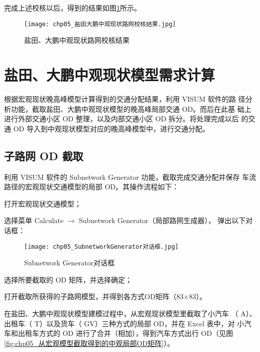 
完成上述校核以后，得到的结果如图\ref{fig:chp05_盐田大鹏中观现状路网校核结果}所示。

\begin{figure}[!ht]
  \centering
  \texttt{[image: chp05\_盐田大鹏中观现状路网校核结果.jpg]}
  \caption{盐田、大鹏中观现状路网校核结果\label{fig:chp05_盐田大鹏中观现状路网校核结果} }
\end{figure}

\section{盐田、大鹏中观现状模型需求计算}
根据宏观现状晚高峰模型计算得到的交通分配结果，利用 VISUM 软件的路
径分析功能，截取盐田、大鹏中观现状模型的晚高峰局部交通 OD。而后在此基
础上进行外部交通小区 OD 整理，以及内部交通小区 OD 拆分。将处理完成以后
的交通 OD 导入到中观现状模型对应的晚高峰模型中，进行交通分配。

\subsection{子路网 OD 截取}
利用 VISUM 软件的 Subnetwork Generator 功能，截取完成交通分配并保存
车流路径的宏观现状交通模型的局部 OD。其操作流程如下：

\begin{nbeae}
\item 打开宏观现状交通模型；
\item 选择菜单 Calculate $\rightarrow$ Subnetwork Generator（局部路网生成器），
弹出以下对话框：

\begin{figure}[!ht]
  \centering
  \texttt{[image: chp05\_SubnetworkGenerator对话框.jpg]}
  \caption{Subnetwork Generator对话框\label{fig:chp05_Subnetwork Generator对话框} }
\end{figure}

\item 选择所要截取的 OD 矩阵，并选择确定；
\item 打开截取所获得的子路网模型，并得到各方式OD矩阵（83$\times$83）。
\end{nbeae}

在盐田、大鹏中观现状模型建模过程中，从宏观现状模型里截取了小汽车
（ A）、出租车（ T）以及货车（ GV）三种方式的局部 OD，并在 Excel 表中，对
小汽车和出租车方式的 OD 进行了合并（相加），得到汽车方式出行 OD（见图\ref{fig:chp05_从宏观模型截取得到的中观局部OD矩阵}）。

